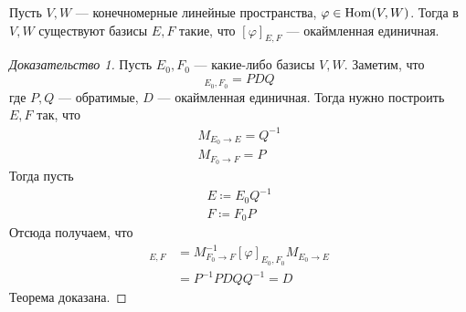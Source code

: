 \documentclass[../main.tex]{subfiles}
\begin{document}
\begin{theorem}
\label{th:7.1}
  Пусть $V, W$ --- конечномерные линейные пространства, $\varphi \in \operatorname{Hom}(V, W)$. Тогда в $V, W$ существуют базисы $E, F$ такие, что
  $
    [\varphi]_{E, F}\text{ --- окаймленная единичная}
  $.
\end{theorem}
\begin{proof}[Доказательство 1]
  Пусть $E_0, F_0$ --- какие-либо базисы $V, W$. Заметим, что
  \begin{equation*}
    [\varphi]_{E_0, F_0} = PDQ
  \end{equation*}
  где $P, Q$ --- обратимые, $D$ --- окаймленная единичная. Тогда нужно построить $E, F$ так, что
  \begin{equation*}
    \begin{gathered}
      M_{E_0 \to E} = Q^{-1} \\
      M_{F_0 \to F} = P
    \end{gathered}
  \end{equation*}
  Тогда пусть
  \begin{equation*}
    \begin{gathered}
      E \coloneqq E_0Q^{-1} \\
      F \coloneqq F_0P
    \end{gathered}
  \end{equation*}
  Отсюда получаем, что
  \begin{align*}
    [\varphi]_{E, F}
    &= M_{F_0 \to F}^{-1} [\varphi]_{E_0, F_0} M_{E_0 \to E}
    \\
    &=P^{-1}PDQQ^{-1} = D
  \end{align*}
  Теорема доказана.
\end{proof}
\end{document}
